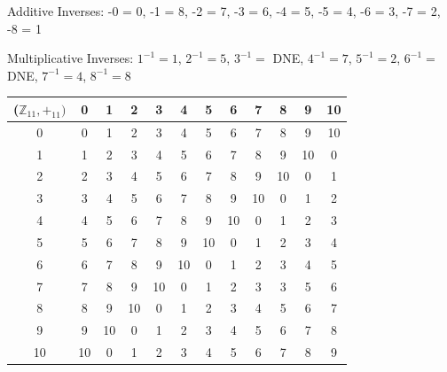 \documentclass{article}
\begin{document}
\item[] Additive Inverses: -0 = 0, -1 = 8, -2 = 7, -3 = 6, -4 = 5, -5 = 4, -6 = 3, -7 = 2, -8 = 1
\item[] Multiplicative Inverses: $1^{-1} = 1$, $2^{-1} = 5$, $3^{-1} =$ DNE, $4^{-1} = 7$, $5^{-1} = 2$, $6^{-1} =$ DNE, $7 ^{-1} = 4$, $8^{-1} = 8$

\clearpage
\header
\item[]\begin{center}
 \begin{tabular}{||c c c c c c c c c c c c ||} 
 \hline
 ($\mathbb{Z}_{11}, +_{11})$ & 0 & 1 & 2 & 3 & 4 & 5 & 6 & 7 & 8 & 9 & 10 \\ [0.5ex] 
 \hline\hline
 0 & 0 & 1 & 2 & 3 & 4 & 5 & 6 & 7 & 8 & 9 & 10\\
 \hline
 1 & 1 & 2 & 3 & 4 & 5 & 6 & 7 & 8 & 9 & 10 & 0 \\ 
 \hline
 2 & 2 & 3 & 4 & 5 & 6 & 7 & 8 & 9 & 10 & 0 & 1 \\
 \hline
 3 & 3 & 4 & 5 & 6 & 7 & 8 & 9 & 10 & 0 & 1 & 2 \\
 \hline
 4 & 4 & 5 & 6 & 7 & 8 & 9 & 10 & 0 & 1 & 2 & 3 \\
 \hline
 5 & 5 & 6 & 7 & 8 & 9 & 10 & 0 & 1 & 2 & 3 & 4 \\ 
 \hline
 6 & 6 & 7 & 8 & 9 & 10 & 0 & 1 & 2 & 3 & 4 & 5 \\
 \hline
 7 & 7 & 8 & 9 & 10 & 0 & 1 & 2 & 3 & 3 & 5 & 6 \\
 \hline
 8 & 8 & 9 & 10 & 0 & 1 & 2 & 3 & 4 & 5 & 6 & 7 \\ 
 \hline 
 9 & 9 & 10 & 0 & 1 & 2 & 3 & 4 & 5 & 6 & 7 & 8 \\
 \hline 
 10 & 10 & 0 & 1 & 2 & 3 & 4 & 5 & 6 & 7 & 8 & 9 \\
 \hline
\end{tabular}
\end{center} 
\end{document}
